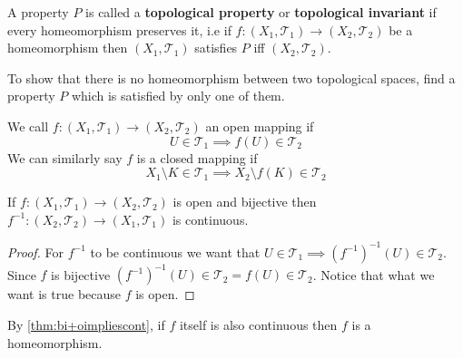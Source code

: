 \documentclass{scrartcl} %
\newcommand{\Tau}{\mathcal{T}}
\begin{document}
\begin{definition}
	A property $P$ is called a \textbf{topological property} or \textbf{topological invariant} if every 
	homeomorphism preserves it, i.e if $f : \left(X_1, \Tau_1\right) \rightarrow \left(X_2, \Tau_2\right)$
	be a homeomorphism then $\left(X_1, \Tau_1\right)$ satisfies $P$ iff $\left(X_2, \Tau_2\right)$. 
\end{definition}
\begin{remark}
To show that there is no homeomorphism between two topological spaces, find a property $P$ which is satisfied
by only one of them.
\end{remark}
\begin{definition}
We call $f: \left(X_1, \Tau_1\right) \rightarrow \left(X_2, \Tau_2\right)$ an open mapping if
\[
U \in \Tau_1 \implies f(U) \in \Tau_2
\]
We can similarly say $f$ is a closed mapping if
\[
	X_1\setminus K \in \Tau_1 \implies X_2 \setminus f\left(K\right) \in \Tau_2
\]
\newpage
\begin{lemma}\label{thm:bi+oimpliescont}
	If $f : \left(X_1, \Tau_1\right) \rightarrow \left(X_2, \Tau_2\right)$ is open and bijective then
	$f^{-1}: \left(X_2, \Tau_2\right) \rightarrow \left(X_1, \Tau_1\right)$ is continuous.
\end{lemma}
\begin{proof}
	For $f^{-1}$ to be continuous we want that $U \in \Tau_1 \implies \left(f^{-1}\right)^{-1}(U) \in \Tau_2$.\\
	Since $f$ is bijective $ \left(f^{-1}\right)^{-1}(U) \in \Tau_2 =  f(U) \in \Tau_2$. Notice that what we want
	is true because $f$ is open.
\end{proof}
\begin{remark}
	By \autoref{thm:bi+oimpliescont}, if $f$ itself is also continuous then $f$ is a homeomorphism.
\end{remark}
\end{definition}
\end{document}

